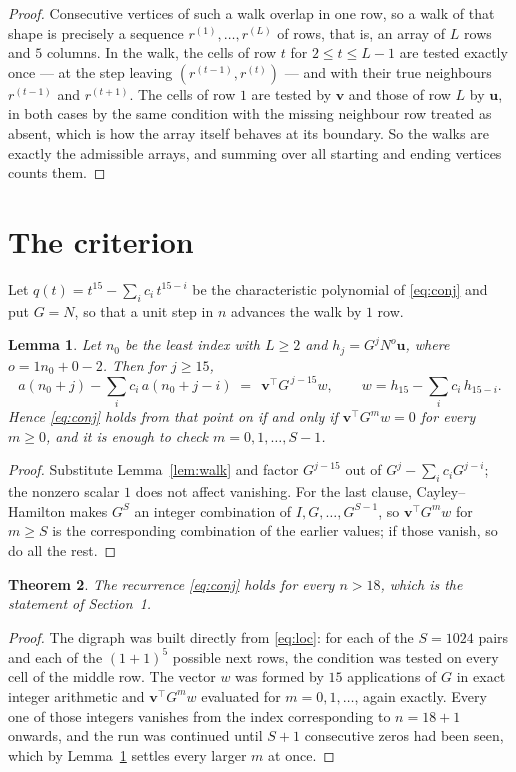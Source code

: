 \documentclass[11pt,a4paper]{article}
\theoremstyle{plain}
\newtheorem{theorem}{Theorem}
\newtheorem{lemma}[theorem]{Lemma}
\theoremstyle{definition}
\begin{document}
\begin{proof}
Consecutive vertices of such a walk overlap in one row, so a walk of that shape is
precisely a sequence $r^{(1)},\dots,r^{(L)}$ of rows, that is, an array of $L$ rows
and $5$ columns. In the walk, the cells of row $t$ for $2\le t\le L-1$ are tested
exactly once --- at the step leaving $(r^{(t-1)},r^{(t)})$ --- and with their true
neighbours $r^{(t-1)}$ and $r^{(t+1)}$. The cells of row $1$ are tested by
$\mathbf{v}$ and those of row $L$ by $\mathbf{u}$, in both cases by the same condition
with the missing neighbour row treated as absent, which is how the array itself behaves at
its boundary. So the walks are exactly the admissible arrays, and summing over all starting
and ending vertices counts them.
\end{proof}

\section{The criterion}

Let $q(t)=t^{15}-\sum_i c_i\,t^{15-i}$ be the characteristic polynomial of
\eqref{eq:conj} and put $G=N$, so that a unit step in $n$ advances the walk by
$1$ row.

\begin{lemma}\label{lem:crit}
Let $n_0$ be the least index with $L\ge2$ and $h_j=G^{j}N^{o}\mathbf{u}$, where
$o=1n_0+0-2$. Then for $j\ge15$,
\[
a(n_0+j)-\sum_i c_i\,a(n_0+j-i)\;=\;\,\mathbf{v}^{\!\top}G^{\,j-15}w,
\qquad w=h_{15}-\sum_i c_i\,h_{15-i} .
\]
Hence \eqref{eq:conj} holds from that point on if and only if
$\mathbf{v}^{\!\top}G^{m}w=0$ for every $m\ge0$, and it is enough to check
$m=0,1,\dots,S-1$.
\end{lemma}

\begin{proof}
Substitute Lemma~\ref{lem:walk} and factor $G^{j-15}$ out of
$G^{j}-\sum_ic_iG^{j-i}$; the nonzero scalar $1$ does not affect
vanishing. For the last clause, Cayley--Hamilton makes $G^{S}$ an integer combination of
$I,G,\dots,G^{S-1}$, so $\mathbf{v}^{\!\top}G^{m}w$ for $m\ge S$ is the corresponding
combination of the earlier values; if those vanish, so do all the rest.
\end{proof}

\begin{theorem}
The recurrence \eqref{eq:conj} holds for every $n>18$, which is the statement of
Section~1.
\end{theorem}

\begin{proof}
The digraph was built directly from \eqref{eq:loc}: for each of the $S=1024$ pairs and each
of the $(1+1)^{5}$ possible next rows, the condition was tested on every cell of
the middle row. The vector $w$ was formed by $15$ applications of $G$ in exact integer
arithmetic and $\mathbf{v}^{\!\top}G^{m}w$ evaluated for $m=0,1,\dots$, again exactly.
Every one of those integers vanishes from the index corresponding to $n=18+1$ onwards,
and the run was continued until $S+1$ consecutive zeros had been seen, which by
Lemma~\ref{lem:crit} settles every larger $m$ at once.
\end{proof}
\end{document}
